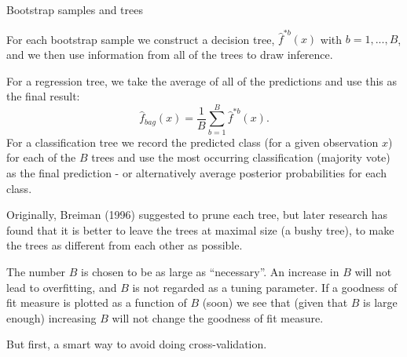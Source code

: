 \documentclass[10pt,ignorenonframetext,]{beamer}
\begin{document}
\begin{frame}

\begin{block}{Bootstrap samples and trees}

For each bootstrap sample we construct a decision tree,
\(\hat{f}^{*b}(x)\) with \(b=1,...,B\), and we then use information from
all of the trees to draw inference.

For a regression tree, we take the average of all of the predictions and
use this as the final result: \[
\hat{f}_{bag}(x)=\frac{1}{B}\sum_{b=1}^B \hat{f}^{*b}(x).
\] For a classification tree we record the predicted class (for a given
observation \(x\)) for each of the \(B\) trees and use the most
occurring classification (majority vote) as the final prediction - or
alternatively average posterior probabilities for each class.

\end{block}

\end{frame}

\begin{frame}

Originally, Breiman (1996) suggested to prune each tree, but later
research has found that it is better to leave the trees at maximal size
(a bushy tree), to make the trees as different from each other as
possible.

The number \(B\) is chosen to be as large as ``necessary''. An increase
in \(B\) will not lead to overfitting, and \(B\) is not regarded as a
tuning parameter. If a goodness of fit measure is plotted as a function
of \(B\) (soon) we see that (given that \(B\) is large enough)
increasing \(B\) will not change the goodness of fit measure.

But first, a smart way to avoid doing cross-validation.

\end{frame}
\end{document}
